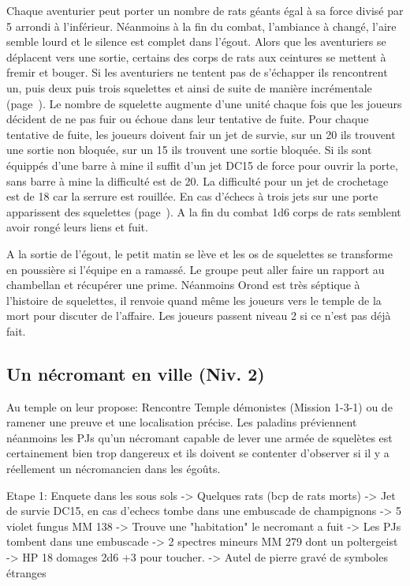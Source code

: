 Chaque aventurier peut porter un nombre de rats géants égal à sa force divisé par 5 arrondi à l'inférieur.
Néanmoins à la fin du combat, l'ambiance à changé, l'aire semble lourd et le silence est complet dans 
l'égout. Alors que les aventuriers se déplacent vers une sortie, certains des corps 
de rats aux ceintures se mettent à fremir et bouger. Si les aventuriers ne tentent pas de s'échapper 
ils rencontrent un, puis deux puis trois squelettes et ainsi de suite de manière incrémentale 
(page~\pageref{Squelette}). Le nombre de squelette augmente d'une unité chaque fois que les joueurs 
décident de ne pas fuir ou échoue dans leur tentative de fuite. Pour chaque tentative de fuite, les 
joueurs doivent fair un jet de survie, sur un 20 ils trouvent une sortie non bloquée, sur un 15 ils trouvent
une sortie bloquée. Si ils sont équippés d'une barre à mine il suffit d'un jet DC15 de force pour 
ouvrir la porte, sans barre à mine la difficulté est de 20. La difficulté pour un jet de crochetage est de 
18 car la serrure est rouillée. En cas d'échecs à trois jets sur une porte apparissent des squelettes
(page~\pageref{Squelette}). A la fin du combat 1d6 corps de rats semblent avoir rongé leurs liens et fuit. 

A la sortie de l'égout, le petit matin se lève et les os de squelettes se transforme en poussière si 
l'équipe en a ramassé. Le groupe peut aller faire un rapport au chambellan et récupérer une prime. 
Néanmoins Orond est très séptique à l'histoire de squelettes, il renvoie quand même les joueurs vers 
le temple de la mort pour discuter de l'affaire. Les joueurs passent niveau 2 si ce n'est pas déjà fait.

\subsection{Un nécromant en ville (Niv. 2)}

Au temple on leur propose: Rencontre Temple démonistes (Mission 1-3-1) ou de ramener une preuve et une 
localisation précise. Les paladins préviennent néanmoins les PJs qu'un nécromant capable de lever une
armée de squelètes est certainement bien trop dangereux et ils doivent se contenter d'observer si il
y a réellement un nécromancien dans les égoûts.

Etape 1: Enquete dans les sous sols 
 -> Quelques rats (bcp de rats morts)
 -> Jet de survie DC15, en cas d'echecs tombe dans une embuscade de champignons -> 5 violet fungus MM 138
 -> Trouve une "habitation" le necromant a fuit
 -> Les PJs tombent dans une embuscade -> 2 spectres mineurs MM 279 dont un poltergeist -> HP 18 domages 2d6 +3 pour toucher.
 -> Autel de pierre gravé de symboles étranges

